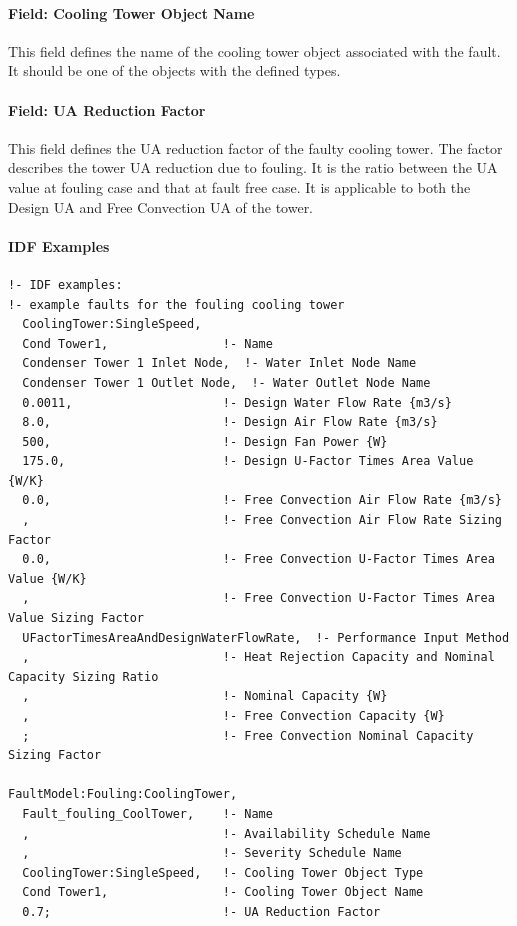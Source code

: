 \paragraph{Field: Cooling Tower Object Name}\label{field-tower-object-name}

This field defines the name of the cooling tower object associated with the fault. It should be one of the objects with the defined types.

\paragraph{Field: UA Reduction Factor}\label{field-ua-reduction-factor}

This field defines the UA reduction factor of the faulty cooling tower. The factor describes the tower UA reduction due to fouling. It is the ratio between the UA value at fouling case and that at fault free case. It is applicable to both the Design UA and Free Convection UA of the tower.

\paragraph{IDF Examples}

\begin{lstlisting}
!- IDF examples:
!- example faults for the fouling cooling tower
  CoolingTower:SingleSpeed,
  Cond Tower1,                !- Name
  Condenser Tower 1 Inlet Node,  !- Water Inlet Node Name
  Condenser Tower 1 Outlet Node,  !- Water Outlet Node Name
  0.0011,                     !- Design Water Flow Rate {m3/s}
  8.0,                        !- Design Air Flow Rate {m3/s}
  500,                        !- Design Fan Power {W}
  175.0,                      !- Design U-Factor Times Area Value {W/K}
  0.0,                        !- Free Convection Air Flow Rate {m3/s}
  ,                           !- Free Convection Air Flow Rate Sizing Factor
  0.0,                        !- Free Convection U-Factor Times Area Value {W/K}
  ,                           !- Free Convection U-Factor Times Area Value Sizing Factor
  UFactorTimesAreaAndDesignWaterFlowRate,  !- Performance Input Method
  ,                           !- Heat Rejection Capacity and Nominal Capacity Sizing Ratio
  ,                           !- Nominal Capacity {W}
  ,                           !- Free Convection Capacity {W}
  ;                           !- Free Convection Nominal Capacity Sizing Factor

FaultModel:Fouling:CoolingTower,
  Fault_fouling_CoolTower,    !- Name
  ,                           !- Availability Schedule Name
  ,                           !- Severity Schedule Name
  CoolingTower:SingleSpeed,   !- Cooling Tower Object Type
  Cond Tower1,                !- Cooling Tower Object Name
  0.7;                        !- UA Reduction Factor
\end{lstlisting}


